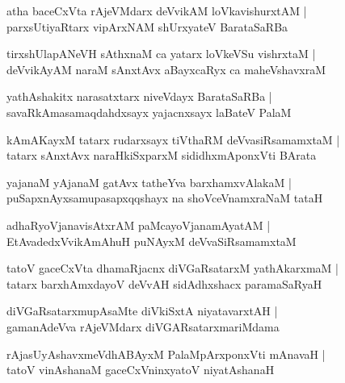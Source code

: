 \documentclass[twoside,12pt,openright]{book}
\newcounter{shloka}[chapter]
\begin{document}
\begin{shloka}
atha baceCxVta rAjeVMdarx deVvikAM loVkavishurxtAM |\\
parxsUtiyaRtarx vipArxNAM shUrxyateV BarataSaRBa
\end{shloka}

\begin{shloka}
tirxshUlapANeVH sAthxnaM ca yatarx loVkeVSu vishrxtaM |\\
deVvikAyAM naraM sAnxtAvx aBayxcaRyx ca maheVshavxraM 
\end{shloka}

\begin{shloka}
yathAshakitx narasatxtarx niveVdayx BarataSaRBa |\\
savaRkAmasamaqdahdxsayx yajacnxsayx laBateV PalaM 
\end{shloka}

\begin{shloka}
kAmAKayxM tatarx rudarxsayx tiVthaRM deVvasiRsamamxtaM |\\
tatarx sAnxtAvx naraHkiSxparxM sididhxmAponxVti BArata
\end{shloka}

\begin{shloka}
yajanaM yAjanaM gatAvx tatheYva barxhamxvAlakaM |\\
puSapxnAyxsamupasapxqqshayx na shoVceVnamxraNaM tataH
\end{shloka}

\begin{shloka}
adhaRyoVjanavisAtxrAM paMcayoVjanamAyatAM |\\
EtAvadedxVvikAmAhuH puNAyxM deVvaSiRsamamxtaM 
\end{shloka}

\begin{shloka}
tatoV gaceCxVta dhamaRjacnx diVGaRsatarxM yathAkarxmaM |\\
tatarx barxhAmxdayoV deVvAH sidAdhxshacx paramaSaRyaH 
\end{shloka}

\begin{shloka}
diVGaRsatarxmupAsaMte diVkiSxtA niyatavarxtAH |\\
gamanAdeVva rAjeVMdarx diVGARsatarxmariMdama 
\end{shloka}

\begin{shloka}
rAjasUyAshavxmeVdhABAyxM PalaMpArxponxVti mAnavaH |\\
tatoV vinAshanaM gaceCxVninxyatoV niyatAshanaH 
\end{shloka}
\end{document}
